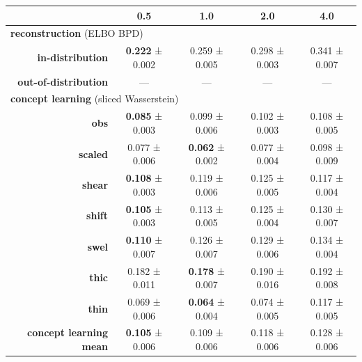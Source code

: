 \begin{tabular}{rcccc}
\toprule
& \textbf{0.5} & \textbf{1.0} & \textbf{2.0} & \textbf{4.0} \\
\midrule
\multicolumn{ 5 }{l}{\textbf{reconstruction}  (ELBO BPD)} \\
\midrule
\textbf{in-distribution} & \textbf{0.222} ± 0.002 & 0.259 ± 0.005 & 0.298 ± 0.003 & 0.341 ± 0.007 \\
\textbf{out-of-distribution} & --- & --- & --- & --- \\
\midrule
\multicolumn{ 5 }{l}{\textbf{concept learning}  (sliced Wasserstein)} \\
\midrule
\textbf{obs} & \textbf{0.085} ± 0.003 & 0.099 ± 0.006 & 0.102 ± 0.003 & 0.108 ± 0.005 \\
\textbf{scaled} & 0.077 ± 0.006 & \textbf{0.062} ± 0.002 & 0.077 ± 0.004 & 0.098 ± 0.009 \\
\textbf{shear} & \textbf{0.108} ± 0.003 & 0.119 ± 0.006 & 0.125 ± 0.005 & 0.117 ± 0.004 \\
\textbf{shift} & \textbf{0.105} ± 0.003 & 0.113 ± 0.005 & 0.125 ± 0.004 & 0.130 ± 0.007 \\
\textbf{swel} & \textbf{0.110} ± 0.007 & 0.126 ± 0.007 & 0.129 ± 0.006 & 0.134 ± 0.004 \\
\textbf{thic} & 0.182 ± 0.011 & \textbf{0.178} ± 0.007 & 0.190 ± 0.016 & 0.192 ± 0.008 \\
\textbf{thin} & 0.069 ± 0.006 & \textbf{0.064} ± 0.004 & 0.074 ± 0.005 & 0.117 ± 0.005 \\
\addlinespace
\textbf{concept learning mean} & \textbf{0.105} ± 0.006 & 0.109 ± 0.006 & 0.118 ± 0.006 & 0.128 ± 0.006 \\
\midrule
\bottomrule
\end{tabular}
